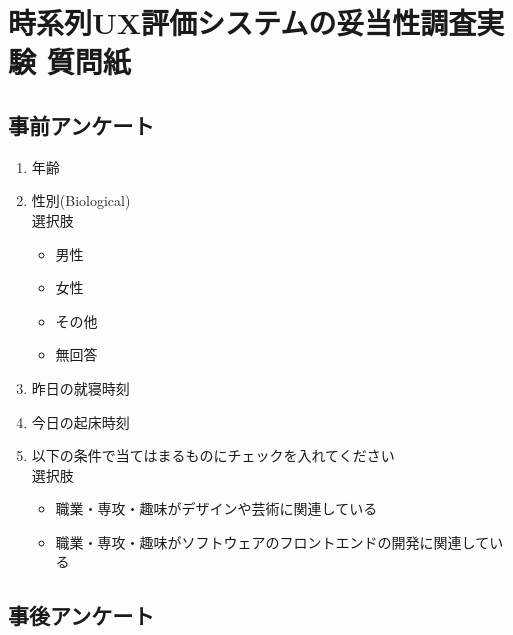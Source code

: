\chapter{時系列UX評価システムの妥当性調査実験 質問紙}
\section{事前アンケート}
\begin{enumerate}
  \item 年齢
  \item 性別(Biological)
  \\選択肢
 \begin{itemize}
  \item 男性
  \item 女性
  \item その他
  \item 無回答
\end{itemize}
  \item 昨日の就寝時刻
  \item 今日の起床時刻
  \item 以下の条件で当てはまるものにチェックを入れてください\\
  選択肢
  \begin{itemize}
  \item 職業・専攻・趣味がデザインや芸術に関連している
  \item 職業・専攻・趣味がソフトウェアのフロントエンドの開発に関連している
\end{itemize}
\end{enumerate}

\section{事後アンケート}

